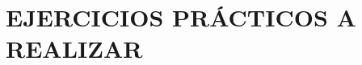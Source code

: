 \documentclass[a4paper]{article}
\begin{document}
    
    
    
    \pagestyle{fancy}
    
    \section{EJERCICIOS PRÁCTICOS A REALIZAR}
    
    
    
    
\end{document}

